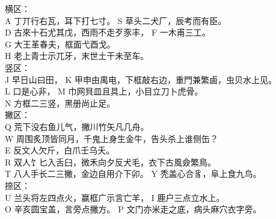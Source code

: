 \documentclass{ctexart}
\begin{document}
    \vspace{5mm}

        \fontsize{16pt}{16pt} \selectfont 

    \begin{multicols}{2}
        横区：\\
        A 丁丌行右瓦，耳下打七寸。 S 草头二犬厂，辰考而有臣。\\
    D 古來十石尤其戊，西雨不走歹豕丰， F 一木甫三工。\\
    G 大王革春夫，框面弋酉戈。\\
    H 老上青士示兀牙，末世土干未至车。\\
    \vspace{12pt}
    竖区：\\
    J 早日山曰田， K 甲申由禺电，下框敲右边，重門兼繁鹵，虫贝水上见。\\
    L 口是心非， M 巾网貝皿且具上，小目立刀卜虎骨。\\
    N 方框二三竖，黑册尚止足。\\
    
    撇区：\\
    Q 荒下没右鱼儿气，撇川竹矢凡几舟。 \\
    W 周围炙顶皆同月，千鬼上身生金牛，告头杀上谁侧缶？\\
    E 反文人欠斤，白爪壬乌夭。\\
    R 双人饣匕入舌臼，微禾向夕反犬毛，衣下古風僉繁鳥。\\
    T 八人手长二三撇，金边自用介下卯。 Y 秃盖心合豸，阜上食九鸟。\\
    \vspace{12pt}
    捺区：\\
    U 兰头将左四点火，赢框广示言亡羊， I 鹿户三点立水上。\\
    O 辛亥圆宝盖，言旁点撇方。 P 文门亦米走之底，病头麻穴衣字旁。\\
        \end{multicols}
\end{document}
